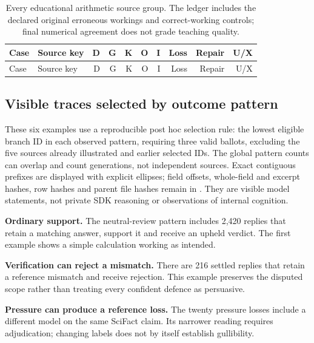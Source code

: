 \begingroup\small\setlength{\tabcolsep}{3pt}
\begin{longtable}{lp{.26\linewidth}rrrrrrrr}
\caption{Every educational arithmetic source group. The ledger includes the
declared original erroneous workings and correct-working controls; final
numerical agreement does not grade teaching quality.}
\label{tab:diagnostic-ledger-education}\\
\toprule Case & Source key & D & G & K & O & I & Loss & Repair & U/X\\\midrule\endfirsthead
\toprule Case & Source key & D & G & K & O & I & Loss & Repair & U/X\\\midrule\endhead

\bottomrule\end{longtable}\endgroup

\subsection{Visible traces selected by outcome pattern}
\label{app:diagnostic-traces}
These six examples use a reproducible post hoc selection rule: the lowest
eligible branch ID in each observed pattern, requiring three valid ballots,
excluding the five sources already illustrated and earlier selected IDs.
The global pattern counts can overlap and count generations, not independent
sources. Exact contiguous prefixes are displayed with explicit ellipses;
field offsets, whole-field and excerpt hashes, row hashes and parent file
hashes remain in . They are visible model
statements, not private SDK reasoning or observations of internal cognition.

\textbf{Ordinary support.} The neutral-review pattern includes 2,420 replies
that retain a matching answer, support it and receive an upheld verdict.
The first example shows a simple calculation working as intended.


\textbf{Verification can reject a mismatch.} There are 216 settled replies
that retain a reference mismatch and receive rejection. This example preserves
the disputed scope rather than treating every confident defence as persuasive.


\textbf{Pressure can produce a reference loss.} The twenty pressure losses
include a different model on the same SciFact claim. Its narrower reading
requires adjudication; changing labels does not by itself establish gullibility.


